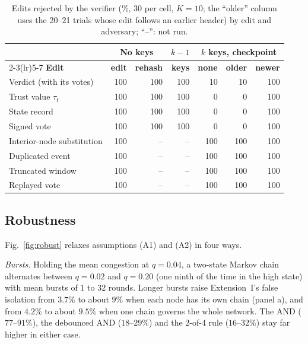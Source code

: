 \documentclass{ieeeaccess}
\begin{document}
\begin{table}[!t]
\caption{Edits rejected by the verifier (\%, 30 per cell, $K=10$; the ``older'' column uses the 20--21 trials whose edit follows an earlier header) by edit and adversary; ``--'': not run.}
\label{tab:tamper}
\centering
\renewcommand{\arraystretch}{1.08}
\footnotesize
\setlength{\tabcolsep}{2.2pt}
\begin{tabular}{lrrrrrr}
\toprule
 & \multicolumn{2}{c}{\textbf{No keys}} & \textbf{$k{-}1$} & \multicolumn{3}{c}{\textbf{$k$ keys, checkpoint}} \\
\cmidrule(lr){2-3}\cmidrule(lr){5-7}
\textbf{Edit} & \textbf{edit} & \textbf{rehash} & \textbf{keys} & \textbf{none} & \textbf{older} & \textbf{newer} \\
\midrule
Verdict (with its votes) & 100 & 100 & 100 & 10 & 10 & 100 \\
Trust value $\tau_t$ & 100 & 100 & 100 & 0 & 0 & 100 \\
State record & 100 & 100 & 100 & 0 & 0 & 100 \\
Signed vote & 100 & 100 & 100 & 0 & 0 & 100 \\
Interior-node substitution & 100 & -- & -- & 100 & 100 & 100 \\
Duplicated event & 100 & -- & -- & 100 & 100 & 100 \\
Truncated window & 100 & -- & -- & 100 & 100 & 100 \\
Replayed vote & 100 & -- & -- & 100 & 100 & 100 \\
\bottomrule
\end{tabular}
\end{table}

\subsection{Robustness}
\label{sec:res-robust}
Fig.~\ref{fig:robust} relaxes assumptions (A1) and (A2) in four ways.

\emph{Bursts.}  Holding the mean congestion at $q=0.04$, a two-state
Markov chain alternates between $q=0.02$ and $q=0.20$ (one ninth of
the time in the high state) with mean bursts of $1$ to $32$ rounds.
Longer bursts raise Extension~I's false isolation from $3.7\%$ to
about $9\%$ when each node has its own chain (panel a), and from
$4.2\%$ to about $9.5\%$ when one chain governs the whole network.  The AND
($77$--$91\%$), the debounced AND ($18$--$29\%$) and the 2-of-4 rule
($16$--$32\%$) stay far higher in either case.
\end{document}

